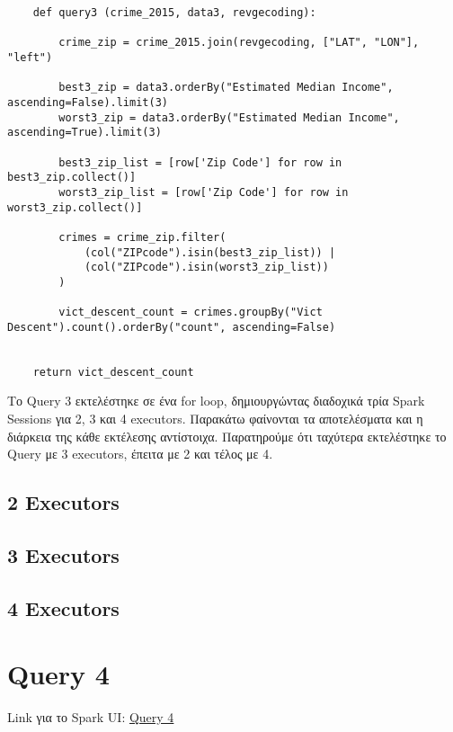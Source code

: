 \documentclass{article}
\begin{document}
\begin{lstlisting}
    def query3 (crime_2015, data3, revgecoding):

        crime_zip = crime_2015.join(revgecoding, ["LAT", "LON"], "left")

        best3_zip = data3.orderBy("Estimated Median Income", ascending=False).limit(3)
        worst3_zip = data3.orderBy("Estimated Median Income", ascending=True).limit(3)
        
        best3_zip_list = [row['Zip Code'] for row in best3_zip.collect()] 
        worst3_zip_list = [row['Zip Code'] for row in worst3_zip.collect()]

        crimes = crime_zip.filter(
            (col("ZIPcode").isin(best3_zip_list)) | 
            (col("ZIPcode").isin(worst3_zip_list))
        )
        
        vict_descent_count = crimes.groupBy("Vict Descent").count().orderBy("count", ascending=False)


    return vict_descent_count
\end{lstlisting}

Το Query 3 εκτελέστηκε σε ένα for loop, δημιουργώντας διαδοχικά τρία Spark Sessions για 2, 3 και 4 executors. Παρακάτω φαίνονται τα αποτελέσματα και η διάρκεια της κάθε εκτέλεσης αντίστοιχα. 
Παρατηρούμε ότι ταχύτερα εκτελέστηκε το Query με 3 executors, έπειτα με 2 και τέλος με 4. 
\subsection*{2 Executors}
\subsection*{3 Executors}

\subsection*{4 Executors}

\section{Query 4}

Link για το Spark UI: 
\href{http://83.212.81.191:18080/history/application_1705357398960_0017/jobs/} {Query 4} \\
\end{document}
